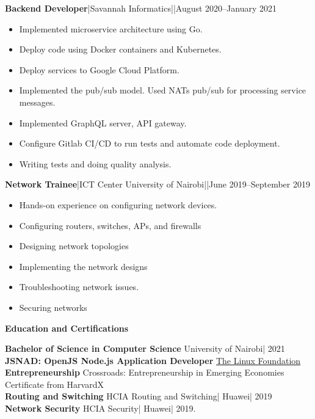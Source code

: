 \documentclass[a4paper]{article}
\begin{document}
\textbf{Backend Developer}|Savannah Informatics||August 2020--January 2021

\begin{itemize}[noitemsep]
    \item Implemented microservice architecture using Go.
    \item Deploy code using Docker containers and Kubernetes.
    \item Deploy services to Google Cloud Platform.
    \item Implemented the pub/sub model. Used NATs pub/sub for processing service messages.
    \item Implemented GraphQL server, API gateway.
    \item Configure Gitlab CI/CD to run tests and automate code deployment.
    \item Writing tests and doing quality analysis.
\end{itemize}

\textbf{Network Trainee}|ICT Center University of Nairobi||June 2019--September 2019

\begin{itemize}[noitemsep]
    \item Hands-on experience on configuring network devices.
    \item Configuring routers, switches, APs, and firewalls
    \item Designing network topologies
    \item Implementing the network designs
    \item Troubleshooting network issues.
    \item Securing networks
\end{itemize}

\begin{center}
    {\Large \textbf{Education and Certifications}}
\end{center}

\textbf{Bachelor of Science in Computer Science} University of Nairobi| 2021 \\
\textbf{JSNAD: OpenJS Node.js Application Developer} \href{https://www.credly.com/badges/ab918a14-4dfd-4800-be45-a6a3a8fbd96c/linked_in}{The Linux Foundation} \\
\textbf{Entrepreneurship} Crossroads: Entrepreneurship in Emerging Economies Certificate from HarvardX \\
\textbf{Routing and Switching} HCIA Routing and Switching| Huawei| 2019 \\
\textbf{Network Security} HCIA Security| Huawei| 2019. \par
\end{document}
